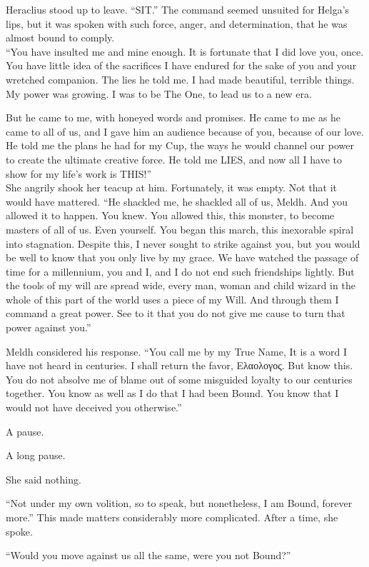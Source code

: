 Heraclius stood up to leave. “SIT.” The command seemed unsuited for Helga’s lips, but it was spoken with such force, anger, and determination, that he was almost bound to comply.\\“You have insulted me and mine enough. It is fortunate that I did love you, once. You have little idea of the sacrifices I have endured for the sake of you and your wretched companion. The lies he told me. I had made beautiful, terrible things. My power was growing. I was to be The One, to lead us to a new era.

But he came to me, with honeyed words and promises. He came to me as he came to all of us, and I gave him an audience because of you, because of our love. He told me the plans he had for my Cup, the ways he would channel our power to create the ultimate creative force. He told me LIES, and now all I have to show for my life’s work is THIS!”\\She angrily shook her teacup at him. Fortunately, it was empty. Not that it would have mattered.
\SmallVSpace
“He shackled me, he shackled all of us, Meldh. And you allowed it to happen. You knew. You allowed this, this monster, to become masters of all of us. Even yourself. You began this march, this inexorable spiral into stagnation. Despite this, I never sought to strike against you, but you would be well to know that you only live by my grace. We have watched the passage of time for a millennium, you and I, and I do not end such friendships lightly. But the tools of my will are spread wide, every man, woman and child wizard in the whole of this part of the world uses a piece of my Will. And through them I command a great power. See to it that you do not give me cause to turn that power against you.”
\pagebreak

Meldh considered his response. “You call me by my True Name, It is a word I have not heard in centuries. I shall return the favor, Ελαολογος. But know this. You do not absolve me of blame out of some misguided loyalty to our centuries together. You know as well as I do that I had been Bound. You know that I would not have deceived you otherwise.”

A pause.

A long pause.

She said nothing.

“Not under my own volition, so to speak, but nonetheless, I am Bound, forever more.” This made matters considerably more complicated. After a time, she spoke.

“Would you move against us all the same, were you not Bound?”

